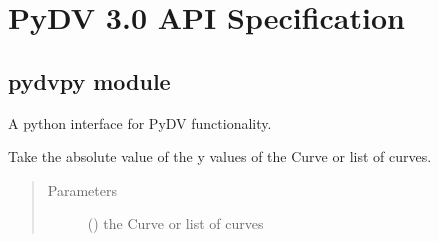 \documentclass[letterpaper,10pt,english]{sphinxmanual}
\begin{document}
\section{PyDV 3.0 API Specification}
\label{\detokenize{pydv:pydv-3-0-api-specification}}\label{\detokenize{pydv::doc}}

\subsection{pydvpy module}
\label{\detokenize{pydv:module-pydvpy}}\label{\detokenize{pydv:pydvpy-module}}
A python interface for PyDV functionality.

\begin{sphinxVerbatim}[commandchars=\\\{\}]
   
\end{sphinxVerbatim}

\begin{fulllineitems}
\label{\detokenize{pydv:pydvpy.abs}}
Take the absolute value of the y values of the Curve or list of curves.

\begin{sphinxVerbatim}[commandchars=\\\{\}]
  
\end{sphinxVerbatim}

\begin{sphinxVerbatim}[commandchars=\\\{\}]
 
\end{sphinxVerbatim}

\begin{sphinxVerbatim}[commandchars=\\\{\}]
\PYG{p}{[}\PYG{p}{]}
\end{sphinxVerbatim}
\begin{quote}\begin{description}
\item[{Parameters}] \leavevmode
{} ({\hyperref[\detokenize{pydv:curve.Curve}]{}}) \textendash{} the Curve or list of curves

\end{description}\end{quote}

\end{fulllineitems}
\end{document}
